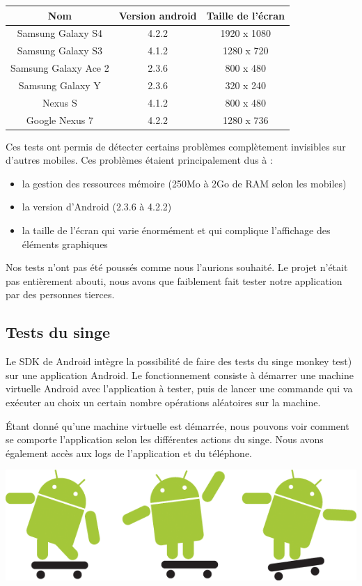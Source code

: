 \documentclass{report}
\begin{document}
\begin{center}
\begin{tabular}{|c|c|c|}
\hline
{\bf Nom} & {\bf Version android} & {\bf Taille de l'écran}\\
\hline
Samsung Galaxy S4 & 4.2.2 & 1920 x 1080\\
\hline
Samsung Galaxy S3 & 4.1.2 & 1280 x 720\\
\hline
Samsung Galaxy Ace 2 & 2.3.6 & 800 x 480\\
\hline
Samsung Galaxy Y & 2.3.6 & 320 x 240\\
\hline
Nexus S & 4.1.2 & 800 x 480\\
\hline
Google Nexus 7 & 4.2.2 & 1280 x 736\\
\hline
\end{tabular}
\end{center}
Ces tests ont permis de détecter certains problèmes complètement
invisibles sur d’autres mobiles. Ces problèmes étaient principalement
dus à :
\bigskip
\begin{itemize}
\item la gestion des ressources mémoire (250Mo à 2Go de RAM selon
les mobiles)
\item la version d’Android (2.3.6 à 4.2.2)
\item la taille de l’écran qui varie énormément et qui complique
l’affichage des éléments graphiques
\end{itemize}
\bigskip

Nos tests n’ont pas été poussés comme nous l’aurions souhaité. Le
projet n’était pas entièrement abouti, nous avons que faiblement fait
tester notre application par des personnes tierces.

\subsection{Tests du singe}
\bigskip


Le SDK de Android intègre la possibilité de faire des tests du singe
monkey test) sur une application Android. Le fonctionnement consiste à
démarrer une machine virtuelle Android avec l’application à tester, puis
de lancer une commande qui va exécuter au choix un certain nombre
opérations aléatoires sur la machine.

Étant donné qu’une machine virtuelle est démarrée, nous pouvons voir
comment se comporte l’application selon les différentes actions du
singe. Nous avons également accès aux logs de l’application et du
téléphone.

\begin{center}
\includegraphics[scale=0.8]{images/monkey}
\end{center}
\end{document}
